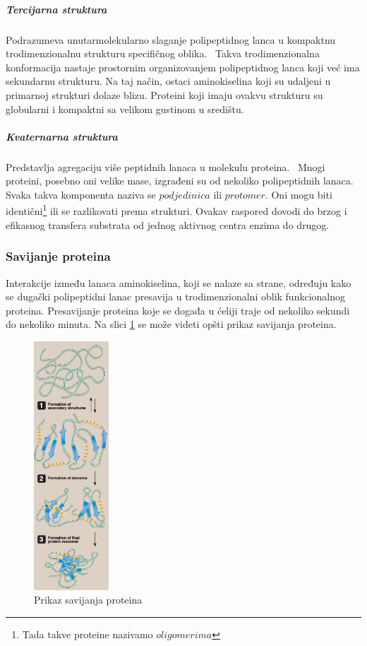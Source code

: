 \documentclass[a4paper]{article}
\begin{document}
\subparagraph{Tercijarna struktura}
Podrazumeva unutarmolekularno slaganje polipeptidnog lanca u kompaktnu trodimenzionalnu strukturu specifičnog oblika.~\cite{medbio}
Takva trodimenzionalna konformacija nastaje prostornim organizovanjem polipeptidnog lanca koji već ima sekundarnu strukturu. Na taj način, ostaci aminokiselina koji su udaljeni u primarnoj strukturi dolaze blizu. Proteini koji imaju ovakvu strukturu su globularni i kompaktni sa velikom gustinom u središtu.~\cite{spasic}
\subparagraph{Kvaternarna struktura}
Predstavlja agregaciju više peptidnih lanaca u molekulu proteina.~\cite{medbio} Mnogi proteini, posebno oni velike mase, izgrađeni su od nekoliko polipeptidnih lanaca. Svaka takva komponenta naziva se $podjedinica$ ili $protomer$. Oni mogu biti identični\footnote{Tada takve proteine nazivamo $oligomerima$} ili se razlikovati prema strukturi. Ovakav raspored dovodi do brzog i efikasnog transfera substrata od jednog aktivnog centra enzima do drugog.~\cite{spasic}
 
\subsubsection{Savijanje proteina}
Interakcije između lanaca aminokiselina, koji se nalaze sa strane, određuju kako se dugački polipeptidni lanac presavija u trodimenzionalni oblik funkcionalnog proteina. Presavijanje proteina koje se događa u ćeliji traje od nekoliko sekundi do nekoliko minuta. 
Na slici \ref{fig:folding} se može videti opšti prikaz savijanja proteina.
\begin{figure}[h]
	\centering
    \includegraphics[width=0.25\textwidth]{Pictures/protein_folding.png}
    \caption{Prikaz savijanja proteina~\cite{lippincott}}
    \label{fig:folding}
\end{figure}
\end{document}
